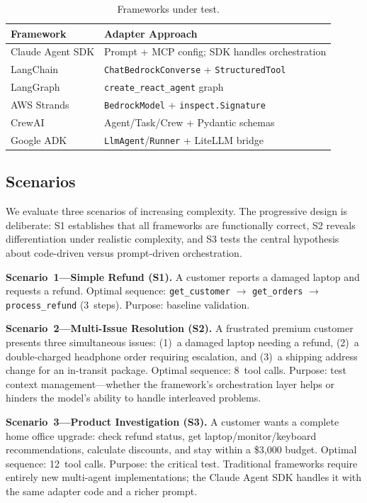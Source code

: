 \documentclass[sigconf]{acmart}
\begin{document}
\begin{table}[t]
  \caption{Frameworks under test.}
  \label{tab:frameworks}
  \small
  \begin{tabular}{ll}
    \toprule
    \textbf{Framework} & \textbf{Adapter Approach} \\
    \midrule
    Claude Agent SDK & Prompt + MCP config; SDK handles orchestration \\
    LangChain & \texttt{ChatBedrockConverse} + \texttt{StructuredTool} \\
    LangGraph & \texttt{create\_react\_agent} graph \\
    AWS Strands & \texttt{BedrockModel} + \texttt{inspect.Signature} \\
    CrewAI & Agent/Task/Crew + Pydantic schemas \\
    Google ADK & \texttt{LlmAgent}/\texttt{Runner} + LiteLLM bridge \\
    \bottomrule
  \end{tabular}
\end{table}

\subsection{Scenarios}

We evaluate three scenarios of increasing complexity. The progressive design is deliberate: S1 establishes that all frameworks are functionally correct, S2 reveals differentiation under realistic complexity, and S3 tests the central hypothesis about code-driven versus prompt-driven orchestration.

\textbf{Scenario~1---Simple Refund (S1).} A customer reports a damaged laptop and requests a refund. Optimal sequence: \texttt{get\_customer} $\rightarrow$ \texttt{get\_orders} $\rightarrow$ \texttt{process\_refund} (3~steps). Purpose: baseline validation.

\textbf{Scenario~2---Multi-Issue Resolution (S2).} A frustrated premium customer presents three simultaneous issues: (1)~a damaged laptop needing a refund, (2)~a double-charged headphone order requiring escalation, and (3)~a shipping address change for an in-transit package. Optimal sequence: 8~tool calls. Purpose: test context management---whether the framework's orchestration layer helps or hinders the model's ability to handle interleaved problems.

\textbf{Scenario~3---Product Investigation (S3).} A customer wants a complete home office upgrade: check refund status, get laptop/monitor/keyboard recommendations, calculate discounts, and stay within a \$3{,}000 budget. Optimal sequence: 12~tool calls. Purpose: the critical test. Traditional frameworks require entirely new multi-agent implementations; the Claude Agent SDK handles it with the same adapter code and a richer prompt.
\end{document}
